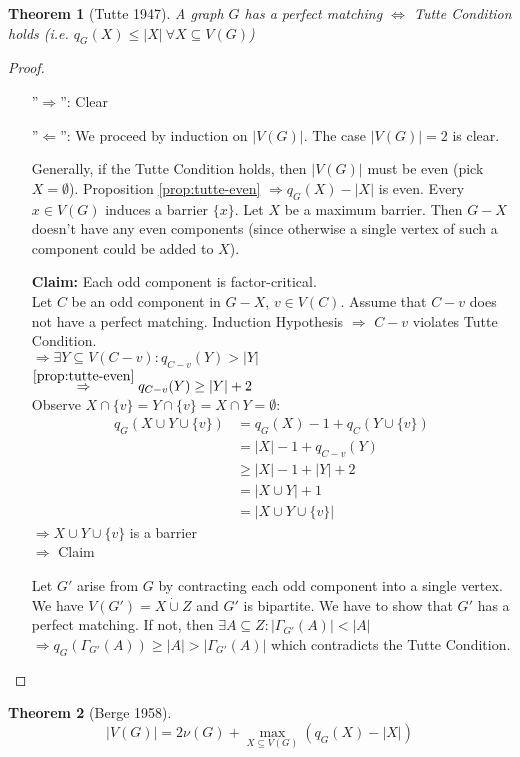 \documentclass[11pt, a4paper]{article}
\newcommand{\abs}[1]{\left\lvert#1\right\rvert}
\newtheorem{theorem}{Theorem}[section]
\theoremstyle{remark}
\theoremstyle{definition}
\begin{document}
\begin{theorem}[Tutte 1947]
	A graph $G$ has a perfect matching $\Leftrightarrow$ Tutte Condition
	holds (i.e. $q_G(X)\leq\abs{X}\ \forall X\subseteq V(G)$)
\end{theorem}
\begin{proof}\ 
\begin{enumerate}
	\item[''$\Rightarrow$'':] Clear
	\item[''$\Leftarrow$'':] We proceed by induction on $\abs{V(G)}$.
	The case $\abs{V(G)}=2$ is clear.
	
	Generally, if the Tutte Condition holds, then $\abs{V(G)}$ must be
	even (pick $X=\emptyset$).
	Proposition \ref{prop:tutte-even} $\Rightarrow q_G(X)-\abs{X}$ is even.
	Every $x\in V(G)$ induces a barrier $\{x\}$. Let $X$ be a maximum
	barrier. Then $G-X$ doesn't have any even components (since otherwise
	a single vertex of such a component could be added to $X$).
	
	\textbf{Claim:} Each odd component is factor-critical. \\
	Let $C$ be an odd component in $G-X$, $v\in V(C)$. Assume that $C-v$
	does not have a perfect matching. Induction Hypothesis $\Rightarrow$
	$C-v$ violates Tutte Condition. \\
	$\Rightarrow \exists Y\subseteq V(C-v): q_{C-v}(Y)>\abs{Y}$ \\
	$\stackrel{\ref{prop:tutte-even}}{\Rightarrow} q_{C-v}(Y)\geq \abs{Y}+2$ \\
	Observe $X\cap\{v\}=Y\cap\{v\}=X\cap Y=\emptyset$:
	\begin{align*}
	q_G(X\cup Y\cup\{v\})&=q_G(X)-1+q_C(Y\cup\{v\}) \\
	&=\abs{X}-1+q_{C-v}(Y) \\
	&\geq\abs{X}-1+\abs{Y}+2 \\
	&=\abs{X\cup Y}+1 \\
	&=\abs{X\cup Y\cup\{v\}}
	\end{align*}
	$\Rightarrow X\cup Y\cup\{v\}$ is a barrier \\
	$\Rightarrow$ Claim
	
	Let $G'$ arise from $G$ by contracting each odd component into a
	single vertex. We have $V(G')=X\dot\cup Z$ and $G'$ is bipartite.
	We have to show that $G'$ has a perfect matching. If not, then
	$\exists A\subseteq Z: \abs{\Gamma_{G'}(A)}<\abs{A}$ \\
	$\Rightarrow q_G(\Gamma_{G'}(A))\geq \abs{A}>\abs{\Gamma_{G'}(A)}$
	which contradicts the Tutte Condition.
\end{enumerate}
\end{proof}

\begin{theorem}[Berge 1958]
	\[\abs{V(G)}=2\nu(G)+\max_{X\subseteq V(G)}(q_G(X)-\abs{X})\]
\end{theorem}
\end{document}
